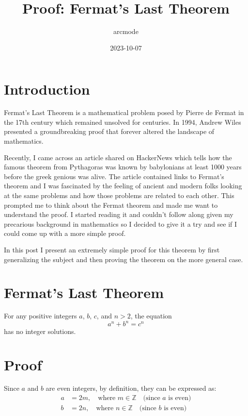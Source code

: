 \documentclass{article}
\begin{document}
\title{Proof: Fermat's Last Theorem}
\author{arcmode}
\date{2023-10-07}

\maketitle

\section{Introduction}
Fermat's Last Theorem is a mathematical problem posed by Pierre de Fermat in the 17th century which remained unsolved for centuries. In 1994, Andrew Wiles presented a groundbreaking proof that forever altered the landscape of mathematics.

Recently, I came across an article shared on HackerNews which tells how the famous theorem from Pythagoras was known by babylonians at least 1000 years before the greek genious was alive. The article contained links to Fermat's theorem and I was fascinated by the feeling of ancient and modern folks looking at the same problems and how those problems are related to each other. This prompted me to think about the Fermat theorem and made me want to understand the proof. I started reading it and couldn't follow along given my precarious background in mathematics so I decided to give it a try and see if I could come up with a more simple proof.

In this post I present an extremely simple proof for this theorem by first generalizing the subject and then proving the theorem on the more general case.

\section*{Fermat's Last Theorem}
For any positive integers $a$, $b$, $c$, and $n > 2$, the equation
\[
a^n + b^n = c^n
\]
has no integer solutions.


\section{Proof}
Since $a$ and $b$ are even integers, by definition, they can be expressed as:
\begin{align*}
a &= 2m, \quad \text{where } m \in \mathbb{Z} \quad \text{(since $a$ is even)} \\
b &= 2n, \quad \text{where } n \in \mathbb{Z} \quad \text{(since $b$ is even)}
\end{align*}
\end{document}
